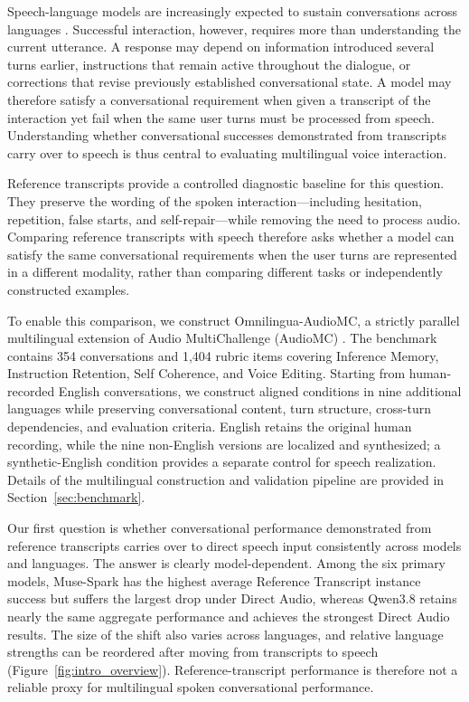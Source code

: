 \documentclass{article}
\begin{document}
Speech-language models are increasingly expected to sustain conversations across languages \citep{qwenteam2026qwen38omni,xu2025qwen3omni}. Successful interaction, however, requires more than understanding the current utterance. A response may depend on information introduced several turns earlier, instructions that remain active throughout the dialogue, or corrections that revise previously established conversational state. A model may therefore satisfy a conversational requirement when given a transcript of the interaction yet fail when the same user turns must be processed from speech. Understanding whether conversational successes demonstrated from transcripts carry over to speech is thus central to evaluating multilingual voice interaction.

Reference transcripts provide a controlled diagnostic baseline for this question. They preserve the wording of the spoken interaction---including hesitation, repetition, false starts, and self-repair---while removing the need to process audio. Comparing reference transcripts with speech therefore asks whether a model can satisfy the same conversational requirements when the user turns are represented in a different modality, rather than comparing different tasks or independently constructed examples.

To enable this comparison, we construct Omnilingua-AudioMC, a strictly parallel multilingual extension of Audio MultiChallenge (AudioMC) \citep{gosai2026audiomultichallenge}. The benchmark contains 354 conversations and 1,404 rubric items covering Inference Memory, Instruction Retention, Self Coherence, and Voice Editing. Starting from human-recorded English conversations, we construct aligned conditions in nine additional languages while preserving conversational content, turn structure, cross-turn dependencies, and evaluation criteria. English retains the original human recording, while the nine non-English versions are localized and synthesized; a synthetic-English condition provides a separate control for speech realization. Details of the multilingual construction and validation pipeline are provided in Section~\ref{sec:benchmark}.

Our first question is whether conversational performance demonstrated from reference transcripts carries over to direct speech input consistently across models and languages. The answer is clearly model-dependent. Among the six primary models, Muse-Spark has the highest average Reference Transcript instance success but suffers the largest drop under Direct Audio, whereas Qwen3.8 retains nearly the same aggregate performance and achieves the strongest Direct Audio results. The size of the shift also varies across languages, and relative language strengths can be reordered after moving from transcripts to speech (Figure~\ref{fig:intro_overview}). Reference-transcript performance is therefore not a reliable proxy for multilingual spoken conversational performance.
\end{document}
